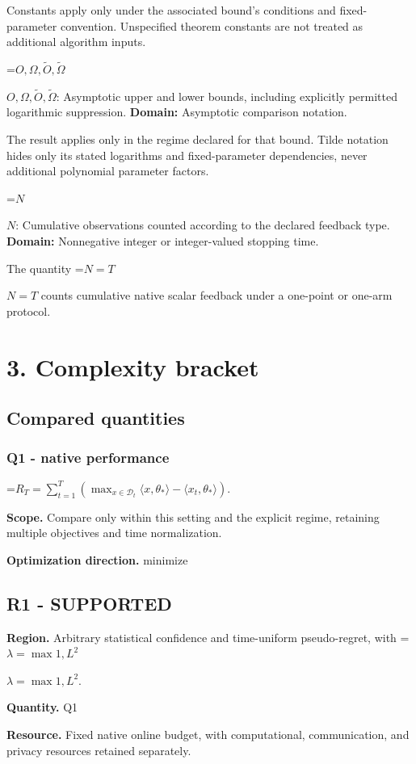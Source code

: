 \documentclass[10pt,a4paper]{article}
\newcommand{\AtlasMath}[1]{\par\begingroup\centering\setbox0=\hbox{$\displaystyle #1$}\ifdim\wd0>1.4\linewidth\typeout{ATLAS WIDE FORMULA: \the\wd0}\fi\ifdim\wd0>\linewidth\resizebox{\linewidth}{!}{\box0}\else\box0\fi\par\endgroup}
\newcommand{\AtlasInlineMath}[1]{\begingroup\setbox0=\hbox{$#1$}\ifdim\wd0>.4\linewidth\endgroup\AtlasMath{#1}\else\endgroup$#1$\fi}
\begin{document}
Constants apply only under the associated bound’s conditions and fixed-parameter convention. Unspecified theorem constants are not treated as additional algorithm inputs.

\AtlasInlineMath{O,\Omega,\widetilde O,\widetilde\Omega}: Asymptotic upper and lower bounds, including explicitly permitted logarithmic suppression. \textbf{Domain:} Asymptotic comparison notation.

The result applies only in the regime declared for that bound. Tilde notation hides only its stated logarithms and fixed-parameter dependencies, never additional polynomial parameter factors.

\AtlasInlineMath{N}: Cumulative observations counted according to the declared feedback type. \textbf{Domain:} Nonnegative integer or integer-valued stopping time.

The quantity \AtlasInlineMath{N=T} counts cumulative native scalar feedback under a one-point or one-arm protocol.

\section{3. Complexity bracket}
\subsection{Compared quantities}
\subsubsection{Q1 - native performance}
\AtlasMath{R_T=\sum_{t=1}^{T}\left(\max_{x\in\mathcal D_t}\langle x,\theta_*\rangle-\langle x_t,\theta_*\rangle\right).}
\textbf{Scope.} Compare only within this setting and the explicit regime, retaining multiple objectives and time normalization.

\textbf{Optimization direction.} minimize

\subsection{R1 - SUPPORTED}
\textbf{Region.} Arbitrary statistical confidence and time-uniform pseudo-regret, with \AtlasInlineMath{\lambda=\max{1,L^{2}}}.

\textbf{Quantity.} Q1

\textbf{Resource.} Fixed native online budget, with computational, communication, and privacy resources retained separately.
\end{document}
